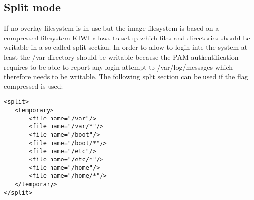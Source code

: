 \subsection{Split mode}

If no overlay filesystem is in use but the image filesystem is based on
a compressed filesystem KIWI allows to setup which files and directories
should be writable in a so called split section. In order to allow to
login into the system at least the /var directory should be writable
because the PAM authentification requires to be able to report any login
attempt to /var/log/messages which therefore needs to be writable. The
following split section can be used if the flag compressed
is used:  

\begin{Command}{12cm}
\begin{verbatim}
<split>
   <temporary>
       <file name="/var"/>
       <file name="/var/*"/>
       <file name="/boot"/>
       <file name="/boot/*"/>
       <file name="/etc"/>
       <file name="/etc/*"/>
       <file name="/home"/>
       <file name="/home/*"/>
   </temporary>
</split>
\end{verbatim}
\end{Command}
